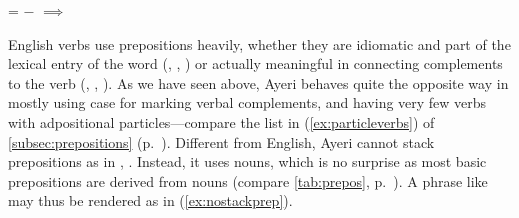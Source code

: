 \begin{morphlex}
\pex\label{ex:lingavanmorphlex}%
\a{}

\a{}

\a\label{ex:telcaserule}%
	\ups{\Tel} = $-$ $\implies$ \ups{\Obj{} \Case{}} \req{}
\Dat{}
\xe
\end{morphlex}

English verbs use prepositions heavily, whether they are idiomatic and part of
the lexical entry of the word (, , ) or
actually meaningful in connecting complements to the verb (, 
, ). As we have seen above, Ayeri behaves quite the
opposite way in mostly using case for marking verbal complements, and having
very few verbs with adpositional particles---compare the list in
(\ref{ex:particleverbs}) of \autoref{subsec:prepositions}
(p.~\pageref{ex:particleverbs}). Different from English, Ayeri cannot stack
prepositions as in , . Instead, it uses nouns, which is no surprise as most basic
prepositions are derived from nouns (compare \autoref{tab:prepos},
p.~\pageref{tab:prepos}). A phrase like  may thus be
rendered as in (\ref{ex:nostackprep}).

